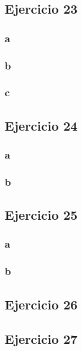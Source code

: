 \documentclass{article}
\begin{document}
\subsection*{Ejercicio 23}

\subsubsection*{a}

\subsubsection*{b}

\subsubsection*{c}

\subsection*{Ejercicio 24}

\subsubsection*{a}

\subsubsection*{b}

\subsection*{Ejercicio 25}

\subsubsection*{a}

\subsubsection*{b}

\subsection*{Ejercicio 26}

\subsection*{Ejercicio 27}
\end{document}
